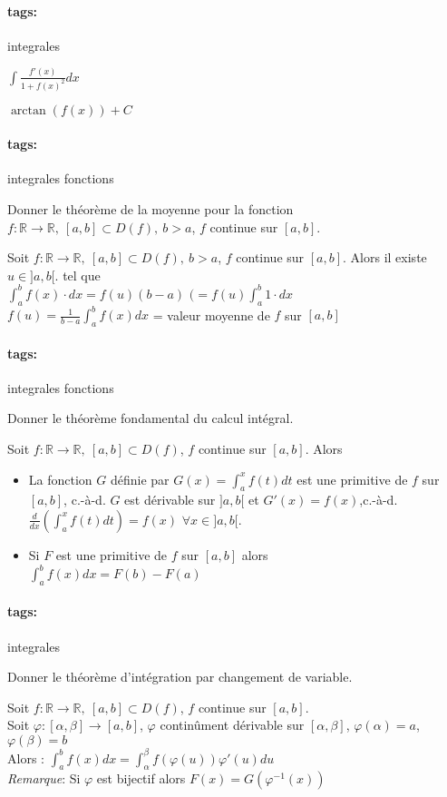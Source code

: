 \documentclass[12pt]{article}
\newcommand*{\xfield}[1]{\begin{mdframed}\centering #1\end{mdframed}\bigskip}
\newenvironment{note}{}{}
\newcommand*{\tags}[1]{\paragraph{tags: }#1}
\begin{document}
\begin{note}
	\tags{integrales}
	\xfield{$\int \frac{f'(x)}{1+f(x)^2} dx$}
	\xfield{$\arctan(f(x)) +C$}
\end{note}


\begin{note}
	\tags{integrales fonctions}
	\xfield{Donner le théorème de la moyenne pour la fonction $f: \mathbb{R} \to \mathbb{R},\ [a,b] \subset D(f),\ b>a$, $f$ continue sur $[a,b]$.}
	\xfield{Soit $f: \mathbb{R} \to \mathbb{R},\ [a,b] \subset D(f),\ b>a$, $f$ continue sur $[a,b]$. Alors il existe $u \in ]a,b[$. tel que\\
	$\int_a^b f(x) \cdot dx = f(u) (b-a)$   $(=f(u) \int_a^b 1 \cdot dx$\\
	$f(u) = \frac{1}{b-a} \int_a^b f(x) dx$ = valeur moyenne de $f$ sur $[a,b]$}
\end{note}

\begin{note}
	\tags{integrales fonctions}
	\xfield{Donner le théorème fondamental du calcul intégral.}
	\xfield{Soit $f: \mathbb{R} \to \mathbb{R},\ [a,b] \subset D(f)$, $f$ continue sur $[a,b]$. Alors 
	\begin{itemize}
		\item La fonction $G$ définie par $G(x) = \int_a^x f(t) dt$ est une primitive de $f$ sur $[a,b]$, c.-à-d. $G$ est dérivable sur $]a,b[$ et $G'(x) = f(x)$,c.-à-d.\\
		$\frac{d}{dx}\left(\int_a^x f(t) dt\right) = f(x)$		$\forall x \in ]a,b[$.
		\item Si $F$ est une primitive de $f$ sur $[a,b]$ alors \\
		$\int_a^b f(x) dx = F(b) - F(a)$
	\end{itemize} }
\end{note}

\begin{note}
	\tags{integrales}
	\xfield{Donner le théorème d'intégration par changement de variable.}
	\xfield{Soit $f: \mathbb{R} \to \mathbb{R},\ [a,b] \subset D(f)$, $f$ continue sur $[a,b]$.\\
	Soit $\varphi : [\alpha,\beta] \to [a,b]$, $\varphi$ continûment dérivable sur $[\alpha,\beta]$, $\varphi(\alpha) = a$, $\varphi(\beta) = b$\\
	Alors : $\int_a^b f(x) dx = \int_\alpha^\beta f(\varphi(u))\varphi'(u) du$\\
	\emph{Remarque}: Si $\varphi$ est bijectif alors $F(x) = G(\varphi^{-1}(x))$ }
\end{note}
\end{document}
